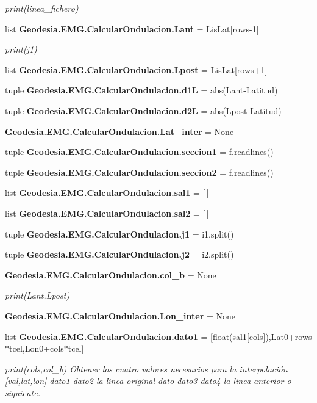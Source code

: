 \begin{DoxyCompactItemize}
\begin{DoxyCompactList}\small\item\em print(linea\-\_\-fichero) \end{DoxyCompactList}\item 
list {\bf Geodesia.\-E\-M\-G.\-Calcular\-Ondulacion.\-Lant} = Lis\-Lat[rows-\/1]
\begin{DoxyCompactList}\small\item\em print(j1) \end{DoxyCompactList}\item 
list {\bf Geodesia.\-E\-M\-G.\-Calcular\-Ondulacion.\-Lpost} = Lis\-Lat[rows+1]
\item 
tuple {\bf Geodesia.\-E\-M\-G.\-Calcular\-Ondulacion.\-d1\-L} = abs(Lant-\/Latitud)
\item 
tuple {\bf Geodesia.\-E\-M\-G.\-Calcular\-Ondulacion.\-d2\-L} = abs(Lpost-\/Latitud)
\item 
{\bf Geodesia.\-E\-M\-G.\-Calcular\-Ondulacion.\-Lat\-\_\-inter} = None
\item 
tuple {\bf Geodesia.\-E\-M\-G.\-Calcular\-Ondulacion.\-seccion1} = f.\-readlines()
\item 
tuple {\bf Geodesia.\-E\-M\-G.\-Calcular\-Ondulacion.\-seccion2} = f.\-readlines()
\item 
list {\bf Geodesia.\-E\-M\-G.\-Calcular\-Ondulacion.\-sal1} = [$\,$]
\item 
list {\bf Geodesia.\-E\-M\-G.\-Calcular\-Ondulacion.\-sal2} = [$\,$]
\item 
tuple {\bf Geodesia.\-E\-M\-G.\-Calcular\-Ondulacion.\-j1} = i1.\-split()
\item 
tuple {\bf Geodesia.\-E\-M\-G.\-Calcular\-Ondulacion.\-j2} = i2.\-split()
\item 
{\bf Geodesia.\-E\-M\-G.\-Calcular\-Ondulacion.\-col\-\_\-b} = None
\begin{DoxyCompactList}\small\item\em print(\-Lant,\-Lpost) \end{DoxyCompactList}\item 
{\bf Geodesia.\-E\-M\-G.\-Calcular\-Ondulacion.\-Lon\-\_\-inter} = None
\item 
list {\bf Geodesia.\-E\-M\-G.\-Calcular\-Ondulacion.\-dato1} = [float(sal1[cols]),Lat0+rows$\ast$tcel,Lon0+cols$\ast$tcel]
\begin{DoxyCompactList}\small\item\em print(cols,col\-\_\-b) Obtener los cuatro valores necesarios para la interpolación [val,lat,lon] dato1 dato2  la linea original dato dato3 dato4  la linea anterior o siguiente. \end{DoxyCompactList}\item 

\end{DoxyCompactItemize}
